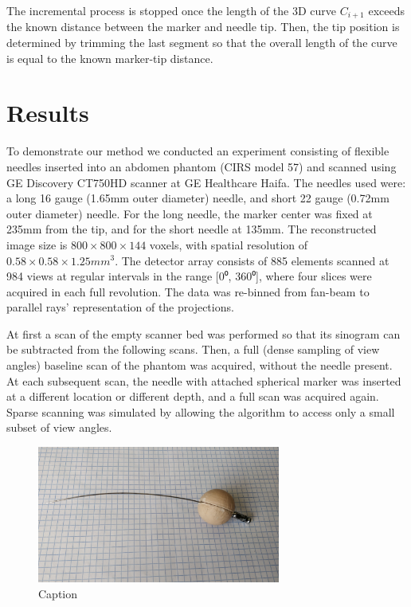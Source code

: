 \documentclass[letterpaper, 11 pt, conference]{ieeeconf}  %
\begin{document}
The incremental process is stopped once the length of the 3D curve $C_{i+1}$ exceeds the known distance between the marker and needle tip. Then, the tip position is determined by trimming the last segment so that the overall length of the curve is equal to the known marker-tip distance.

\section{Results}

To demonstrate our method we conducted an experiment consisting of flexible needles inserted into an abdomen phantom (CIRS model 57) and scanned using GE Discovery CT750HD scanner at GE Healthcare Haifa. The needles used were: a long 16 gauge (1.65mm outer diameter) needle, and short 22 gauge (0.72mm outer diameter) needle. For the long needle, the marker center was fixed at 235mm from the tip, and for the short needle at 135mm.
The reconstructed image size is $ 800 \times 800 \times 144 $ voxels, with spatial resolution of $0.58 \times 0.58 \times 1.25mm^3$. The detector array consists of 885 elements scanned at 984 views at regular intervals in the range [0⁰, 360⁰], where four slices were acquired in each full revolution. The data was re-binned from fan-beam to parallel rays’ representation of the projections.

At first a scan of the empty scanner bed was performed so that its sinogram can be subtracted from the following scans. Then, a full (dense sampling of view angles) baseline scan of the phantom was acquired, without the needle present. At each subsequent scan, the needle with attached spherical marker was inserted at a different location or different depth, and a full scan was acquired again. Sparse scanning was simulated by allowing the algorithm to access only a small subset of view angles.

\begin{figure}[b]
\centering
\includegraphics[width=8cm]{short_needle.jpg}
\caption{Caption}
\label{figurelabel}
\end{figure}
\end{document}
